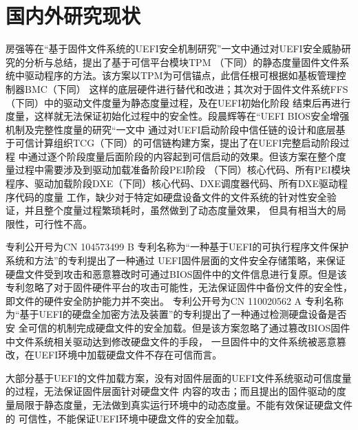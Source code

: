 \section{国内外研究现状}
房强等在“基于固件文件系统的UEFI安全机制研究”一文中通过对UEFI安全威胁研究的分析与总结，提出了基于可信平台模块TPM
（下同）的静态度量固件文件系统中驱动程序的方法。该方案以TPM为可信锚点，此信任根可根据如基板管理控制器BMC（下同）
这样的底层硬件进行替代和改进；其次对于固件文件系统FFS（下同）中的驱动文件度量为静态度量过程，及在UEFI初始化阶段
结束后再进行度量，这样就无法保证初始化过程中的安全性。段晨辉等在“UEFI BIOS安全增强机制及完整性度量的研究“一文中
通过对UEFI启动阶段中信任链的设计和底层基于可信计算组织TCG（下同）的可信链构建方案，提出了在UEFI完整启动阶段过程
中通过逐个阶段度量后面阶段的内容起到可信启动的效果。但该方案在整个度量过程中需要涉及到驱动加载准备阶段PEI阶段
（下同）核心代码、所有PEI模块程序、驱动加载阶段DXE（下同）核心代码、DXE调度器代码、所有DXE驱动程序代码的度量
工作，缺少对于特定如硬盘设备文件的文件系统的针对性安全验证，并且整个度量过程繁琐耗时，虽然做到了动态度量效果，
但具有相当大的局限性，可行性不高。
\par 专利公开号为CN 104573499 B 专利名称为“一种基于UEFI的可执行程序文件保护系统和方法”的专利提出了一种通过
UEFI固件层面的文件安全存储策略，来保证硬盘文件受到攻击和恶意篡改时可通过BIOS固件中的文件信息进行复原。但是该
专利忽略了对于固件硬件平台的攻击可能性，无法保证固件中备份文件的安全性，即文件的硬件安全防护能力并不突出。
专利公开号为CN 110020562 A 专利名称为“基于UEFI的硬盘全加密方法及装置”的专利提出了一种通过检测硬盘设备是否安
全可信的机制完成硬盘文件的安全加载。但是该方案忽略了通过篡改BIOS固件中文件系统相关驱动达到修改硬盘文件的手段，
一旦固件中的文件系统被恶意篡改，在UEFI环境中加载硬盘文件不存在可信而言。
\par 大部分基于UEFI的文件加载方案，没有对固件层面的UEFI文件系统驱动可信度量的过程，无法保证固件层面针对硬盘文件
内容的攻击；而且提出的固件驱动的度量局限于静态度量，无法做到真实运行环境中的动态度量。不能有效保证硬盘文件的
可信性，不能保证UEFI环境中硬盘文件的安全加载。

%
%
